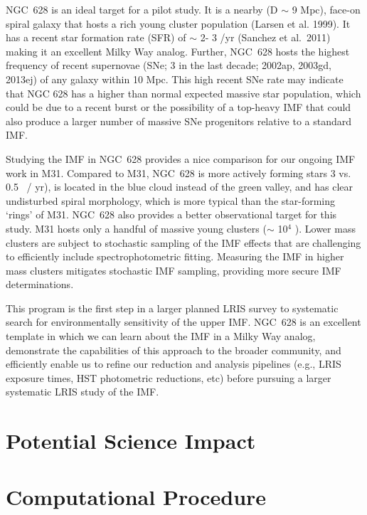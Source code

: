 \documentclass[11pt,preprint]{aastex}
\begin{document}
NGC~628 is an ideal target for a pilot study.  It is a nearby (D $\sim$ 9 Mpc), face-on spiral galaxy that hosts a rich young cluster population (Larsen et al. 1999). It has a recent star formation rate (SFR) of $\sim$ 2- 3 \msun /yr (Sanchez et al.\ 2011) making it an excellent Milky Way analog.  Further, NGC~628 hosts the highest frequency of recent supernovae (SNe; 3 in the last decade;  2002ap, 2003gd, 2013ej) of any galaxy within 10 Mpc.  This high recent SNe rate may indicate that NGC 628 has a higher than normal expected massive star population, which could be due to a recent burst or the possibility of a top-heavy IMF that could also produce a larger number of massive SNe progenitors relative to a standard IMF.

Studying the IMF in NGC~628 provides a nice comparison for our ongoing IMF work in M31.  Compared to M31, NGC~628 is more actively forming stars 3 vs. 0.5 \msun\ / yr), is located in the blue cloud instead of the green valley, and has clear undisturbed spiral morphology, which is more typical than the star-forming `rings' of M31.  NGC~628 also provides a better observational target for this study. M31 hosts only a handful of massive young clusters ($\sim$ 10$^4$ \msun).  Lower mass clusters are subject to stochastic sampling of the IMF effects that are challenging to efficiently include spectrophotometric fitting.  Measuring the IMF in higher mass clusters mitigates stochastic IMF sampling, providing more secure IMF determinations.

This program is the first step in a larger planned LRIS survey to systematic search for environmentally sensitivity of the upper IMF.  NGC~628 is an excellent template in which we can learn about the IMF in a Milky Way analog, demonstrate the capabilities of this approach to the broader community, and efficiently enable us to refine our reduction and analysis pipelines (e.g., LRIS exposure times, HST photometric reductions, etc) before pursuing a larger systematic LRIS study of the IMF.



\section{Potential Science Impact}



\section{Computational Procedure}
\end{document}
